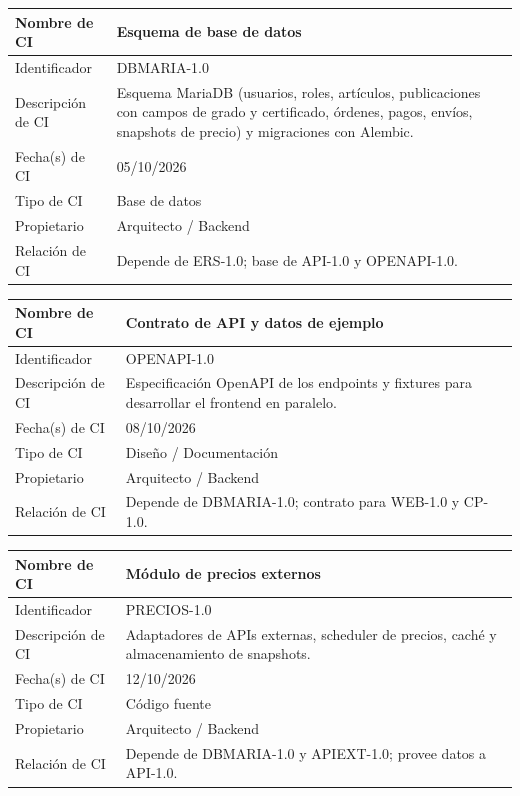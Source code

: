 \documentclass[letterpaper,11pt]{article}
\begin{document}
\noindent\begin{minipage}{\textwidth}
\small\renewcommand{\arraystretch}{1.9}
\begin{tabularx}{\textwidth}{|p{3.3cm}|Y|}
\hline
Nombre de CI & Esquema de base de datos \\ \hline
Identificador & DBMARIA-1.0 \\ \hline
Descripción de CI & Esquema MariaDB (usuarios, roles, artículos, publicaciones con campos de grado y certificado, órdenes, pagos, envíos, snapshots de precio) y migraciones con Alembic. \\ \hline
Fecha(s) de CI & 05/10/2026 \\ \hline
Tipo de CI & Base de datos \\ \hline
Propietario & Arquitecto / Backend \\ \hline
Relación de CI & Depende de ERS-1.0; base de API-1.0 y OPENAPI-1.0. \\ \hline
\end{tabularx}
\end{minipage}\par\bigskip
\noindent\begin{minipage}{\textwidth}
\small\renewcommand{\arraystretch}{1.9}
\begin{tabularx}{\textwidth}{|p{3.3cm}|Y|}
\hline
Nombre de CI & Contrato de API y datos de ejemplo \\ \hline
Identificador & OPENAPI-1.0 \\ \hline
Descripción de CI & Especificación OpenAPI de los endpoints y fixtures para desarrollar el frontend en paralelo. \\ \hline
Fecha(s) de CI & 08/10/2026 \\ \hline
Tipo de CI & Diseño / Documentación \\ \hline
Propietario & Arquitecto / Backend \\ \hline
Relación de CI & Depende de DBMARIA-1.0; contrato para WEB-1.0 y CP-1.0. \\ \hline
\end{tabularx}
\end{minipage}\par\bigskip
\noindent\begin{minipage}{\textwidth}
\small\renewcommand{\arraystretch}{1.9}
\begin{tabularx}{\textwidth}{|p{3.3cm}|Y|}
\hline
Nombre de CI & Módulo de precios externos \\ \hline
Identificador & PRECIOS-1.0 \\ \hline
Descripción de CI & Adaptadores de APIs externas, scheduler de precios, caché y almacenamiento de snapshots. \\ \hline
Fecha(s) de CI & 12/10/2026 \\ \hline
Tipo de CI & Código fuente \\ \hline
Propietario & Arquitecto / Backend \\ \hline
Relación de CI & Depende de DBMARIA-1.0 y APIEXT-1.0; provee datos a API-1.0. \\ \hline
\end{tabularx}
\end{minipage}\par\bigskip
\end{document}

